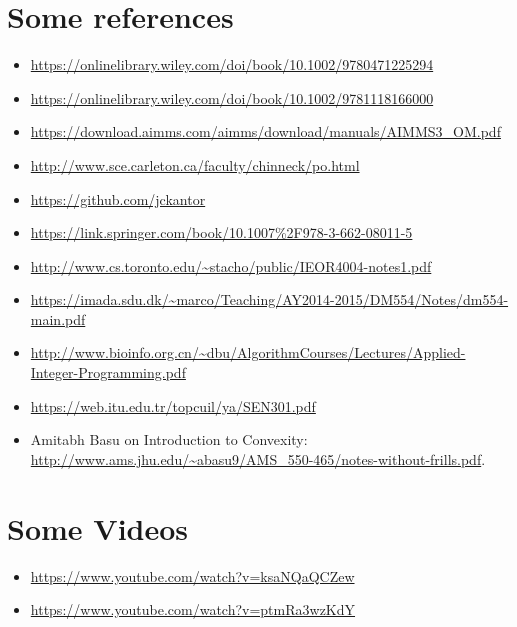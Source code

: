 \section{Some references}
\begin{itemize}
\item \url{https://onlinelibrary.wiley.com/doi/book/10.1002/9780471225294}
\item \url{https://onlinelibrary.wiley.com/doi/book/10.1002/9781118166000}
\item \url{https://download.aimms.com/aimms/download/manuals/AIMMS3_OM.pdf}
\item \url{http://www.sce.carleton.ca/faculty/chinneck/po.html}
\item \url{https://github.com/jckantor}
\item \url{https://link.springer.com/book/10.1007\%2F978-3-662-08011-5}
\item \url{http://www.cs.toronto.edu/~stacho/public/IEOR4004-notes1.pdf}
\item \url{https://imada.sdu.dk/~marco/Teaching/AY2014-2015/DM554/Notes/dm554-main.pdf}
\item \url{http://www.bioinfo.org.cn/~dbu/AlgorithmCourses/Lectures/Applied-Integer-Programming.pdf}
\item \url{https://web.itu.edu.tr/topcuil/ya/SEN301.pdf}
\item Amitabh Basu on Introduction to Convexity: \url{http://www.ams.jhu.edu/~abasu9/AMS_550-465/notes-without-frills.pdf}.
\end{itemize}

\section{Some Videos}
\begin{itemize}
\item \url{https://www.youtube.com/watch?v=ksaNQaQCZew}
\item \url{https://www.youtube.com/watch?v=ptmRa3wzKdY}
\end{itemize}
